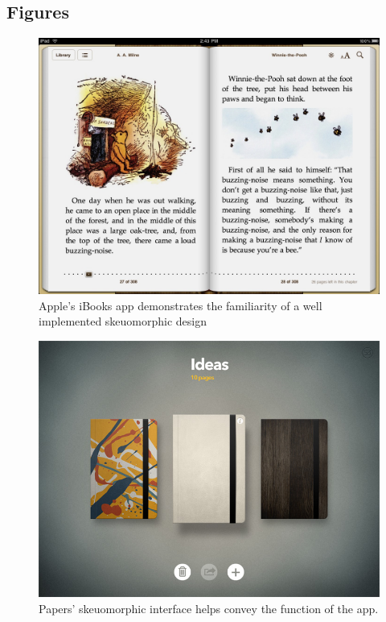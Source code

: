 \documentclass{article}
\begin{document}
\subsection{Figures}

\begin{figure}
\centering
\includegraphics[width=5in]{iBooks.jpg} 

\caption{Apple's iBooks app demonstrates the familiarity of a well implemented skeuomorphic design}
\label{ibooks}
\end{figure}

\begin{figure}
\centering
\includegraphics[width=5in]{paperSmall.jpg}
\caption{Papers' skeuomorphic interface helps convey the function of the app.}
\label{Papers}
\end{figure}
\end{document}
